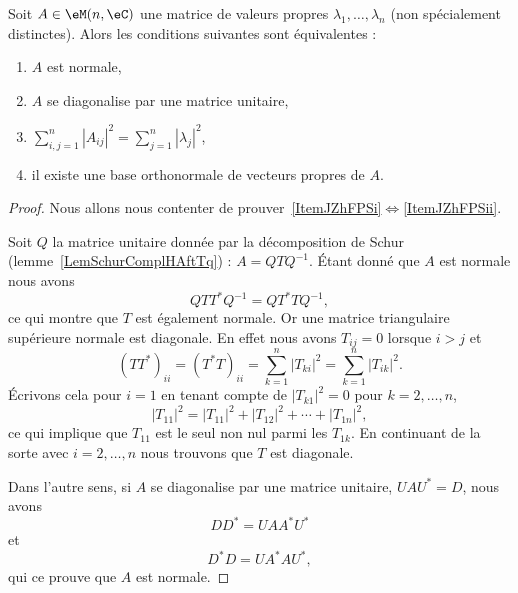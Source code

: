 \begin{theorem}    \label{ThogammwA}
    Soit \( A\in\eM(n,\eC)\) une matrice de valeurs propres \( \lambda_1,\ldots, \lambda_n\) (non spécialement distinctes). Alors les conditions suivantes sont équivalentes :
    \begin{enumerate}
        \item   \label{ItemJZhFPSi}
            \( A\) est normale,
        \item   \label{ItemJZhFPSii}
            \( A\) se diagonalise par une matrice unitaire,
        \item
            \( \sum_{i,j=1}^n| A_{ij} |^2=\sum_{j=1}^n| \lambda_j |^2\),
        \item
            il existe une base orthonormale de vecteurs propres de \( A\).
    \end{enumerate}
\end{theorem}

\begin{proof}
    Nous allons nous contenter de prouver~\ref{ItemJZhFPSi}\( \Leftrightarrow\)\ref{ItemJZhFPSii}.

    Soit \( Q\) la matrice unitaire donnée par la décomposition de Schur (lemme~\ref{LemSchurComplHAftTq}) : \( A=QTQ^{-1}\). Étant donné que \( A\) est normale nous avons
    \begin{equation}
        QTT^*Q^{-1}=QT^*TQ^{-1},
    \end{equation}
    ce qui montre que \( T\) est également normale. Or une matrice triangulaire supérieure normale est diagonale. En effet nous avons \( T_{ij}=0\) lorsque \( i>j\) et
    \begin{equation}
        (TT^*)_{ii}=(T^*T)_{ii}=\sum_{k=1}^n| T_{ki} |^2=\sum_{k=1}^n| T_{ik} |^2.
    \end{equation}
    Écrivons cela pour \( i=1\) en tenant compte de \( | T_{k1} |^2=0\) pour \( k=2,\ldots, n\),
    \begin{equation}
        | T_{11} |^2=| T_{11} |^2+| T_{12} |^2+\cdots+| T_{1n} |^2,
    \end{equation}
    ce qui implique que \( T_{11}\) est le seul non nul parmi les \( T_{1k}\). En continuant de la sorte avec \( i=2,\ldots, n\) nous trouvons que \( T\) est diagonale.

    Dans l'autre sens, si \( A\) se diagonalise par une matrice unitaire, \( UAU^*=D\), nous avons
    \begin{equation}
        DD^*=UAA^*U^*
    \end{equation}
    et
    \begin{equation}
        D^*D=UA^*AU^*,
    \end{equation}
    qui ce prouve que \( A\) est normale.
\end{proof}

